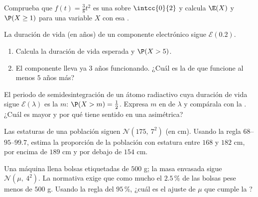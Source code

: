 \begin{exercise}[$\star$]\label{exo:g12:contdist:2}
Comprueba que $f(t) = \frac{3}{8}t^2$ es una  sobre $\intcc{0}{2}$
y calcula $\E(X)$ y $\P(X \geq 1)$ para una variable $X$ con esa .
\end{exercise}

\begin{exercise}[$\star$]\label{exo:g12:contdist:3}
La duración de vida (en años) de un componente electrónico sigue
$\mathcal E(0.2)$.
\begin{enumerate}
  \item Calcula la duración de vida esperada y $\P(X > 5)$.
  \item El componente lleva ya $3$ años funcionando. ¿Cuál es la
         de que funcione al menos $5$ años más?
\end{enumerate}
\end{exercise}

\begin{exercise}[$\star\star$]\label{exo:g12:contdist:4}
El periodo de semidesintegración de un átomo radiactivo cuya duración de
vida sigue $\mathcal E(\lambda)$ es la  $m$: $\P(X > m) = \frac12$.
Expresa $m$ en  de $\lambda$ y compárala con la . ¿Cuál es
mayor y por qué tiene sentido en una  asimétrica?
\end{exercise}

\begin{exercise}[$\star\star$]\label{exo:g12:contdist:5}
Las estaturas de una población siguen $\mathcal N(175,\ 7^2)$ (en cm).
Usando la regla $68$--$95$--$99.7$, estima la proporción de la población
con estatura entre $168$ y $182$ cm, por encima de $189$ cm y por debajo de
$154$ cm.
\end{exercise}

\begin{exercise}[$\star\star$]\label{exo:g12:contdist:6}
Una máquina llena bolsas etiquetadas de $500$ g; la masa envasada sigue
$\mathcal N(\mu,\ 4^2)$. La normativa exige que como mucho el $2.5\,\%$ de
las bolsas pese menos de $500$ g. Usando la regla del $95\,\%$, ¿cuál es el
ajuste  de $\mu$ que cumple la ?
\end{exercise}

